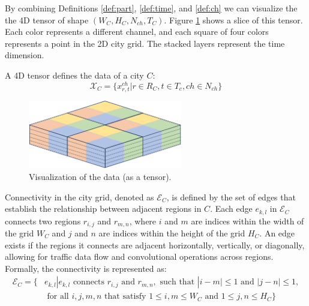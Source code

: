 By combining Definitions \ref{def:part}, \ref{def:time}, and \ref{def:ch} we can visualize the the 4D tensor of shape $(W_C, H_C, N_{ch}, T_C)$. Figure \ref{fig:data_tensor} shows a slice of this tensor. Each color represents a different channel, and each square of four colors represents a point in the 2D city grid. The stacked layers represent the time dimension.

\begin{definition} \label{def:dim}
A 4D tensor defines the data of a city $C$:
	\begin{equation}\label{eq:defdim}
		\mathcal{X}_C = \{x_{r, t}^{ch} | r \in R_C, t \in T_c, ch \in N_{ch}\}
	\end{equation}
\end{definition}

\begin{figure}[!ht]
\noindent\hspace{0.5mm}\includegraphics[width=0.6\textwidth]{./figures/data_tensor.pdf}
\caption{Visualization of the data (as a tensor).}
\label{fig:data_tensor}
\end{figure}

\begin{definition}\label{def:conn}
Connectivity in the city grid, denoted as \( \mathcal{E}_C \), is defined by the set of edges that establish the relationship between adjacent regions in \( C \). Each edge \( e_{k,l} \) in \( \mathcal{E}_C \) connects two regions \( r_{i,j} \) and \( r_{m,n} \), where \( i \) and \( m \) are indices within the width of the grid \( W_C \) and \( j \) and \( n \) are indices within the height of the grid \( H_C \). An edge exists if the regions it connects are adjacent horizontally, vertically, or diagonally, allowing for traffic data flow and convolutional operations across regions. Formally, the connectivity is represented as:
$$
\begin{aligned}
\mathcal{E}_C = \{ & e_{k,l} | e_{k,l} \text{ connects } r_{i,j} \text{ and } r_{m,n}, \text{ such that } |i - m| \leq 1 \text{ and } |j - n| \leq 1, \\
& \text{ for all } i, j, m, n \text{ that satisfy } 1 \leq i, m\leq W_C \text{ and } 1 \leq j, n \leq H_C \}
\end{aligned}
$$
\end{definition}


